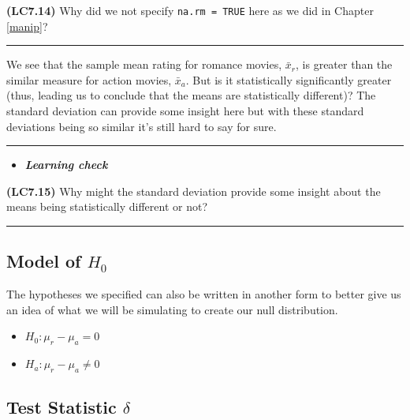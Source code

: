 \documentclass[]{tufte-book}
\let\oldrule=\rule
\renewcommand{\rule}[1]{\oldrule{\linewidth}}
\providecommand{\tightlist}{%
  \setlength{\itemsep}{0pt}\setlength{\parskip}{0pt}}
\newenvironment{rmdblock}[1]
  {\begin{shaded*}
  \begin{itemize}
  \renewcommand{\labelitemi}{
    \raisebox{-.7\height}[0pt][0pt]{
    }
  }
  \item
  }
  {
  \end{itemize}
  \end{shaded*}
  }
\newenvironment{learncheck}
  {\begin{rmdblock}{warning}}
  {\end{rmdblock}}
\begin{document}
\textbf{(LC7.14)} Why did we not specify \texttt{na.rm\ =\ TRUE} here as
we did in Chapter \ref{manip}?

\begin{center}\rule{0.5\linewidth}{\linethickness}\end{center}

We see that the sample mean rating for romance movies, \(\bar{x}_{r}\),
is greater than the similar measure for action movies, \(\bar{x}_a\).
But is it statistically significantly greater (thus, leading us to
conclude that the means are statistically different)? The standard
deviation can provide some insight here but with these standard
deviations being so similar it's still hard to say for sure.

\begin{center}\rule{0.5\linewidth}{\linethickness}\end{center}

\begin{learncheck}
\textbf{\emph{Learning check}}
\end{learncheck}

\textbf{(LC7.15)} Why might the standard deviation provide some insight
about the means being statistically different or not?

\begin{center}\rule{0.5\linewidth}{\linethickness}\end{center}

\subsection{\texorpdfstring{Model of
\(H_0\)}{Model of H\_0}}\label{model-of-h_0-1}

The hypotheses we specified can also be written in another form to
better give us an idea of what we will be simulating to create our null
distribution.

\begin{itemize}
\tightlist
\item
  \(H_0: \mu_r - \mu_a = 0\)
\item
  \(H_a: \mu_r - \mu_a \ne 0\)
\end{itemize}

\subsection{\texorpdfstring{Test Statistic
\(\delta\)}{Test Statistic \textbackslash{}delta}}\label{test-statistic-delta-1}
\end{document}
